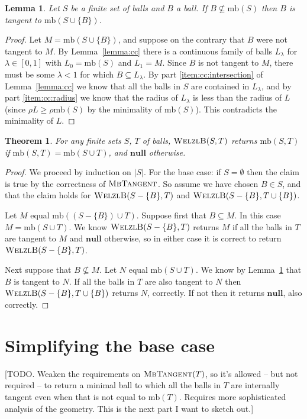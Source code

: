 \documentclass[a4paper]{article}
\newtheorem{lemma}{Lemma}[section]
\newtheorem{theorem}{Theorem}[section]
\newcommand\alg[1]{\mbox{\textsc{#1}}}
\newcommand\undef{\mathbf{null}}
\newcommand\mb{\mathrm{mb}}
\let\radius\rho
\begin{document}
\begin{lemma}\label{lemma:tangent}
  Let $S$ be a finite set of balls and $B$ a ball. If $B\not\subseteq\mb(S)$ then $B$ is tangent to $\mb(S\cup\{B\})$.
\end{lemma}
\begin{proof}
  Let $M = \mb(S\cup\{B\})$, and suppose on the contrary that $B$ were not tangent to $M$.
  By Lemma~\ref{lemma:cc} there is a continuous family of balls $L_\lambda$ for $\lambda\in[0,1]$
  with $L_0=\mb(S)$ and $L_1=M$. Since $B$ is not tangent to $M$, there must be some $\lambda<1$ for which $B\subseteq L_\lambda$. By part \ref{item:cc:intersection} of Lemma~\ref{lemma:cc} we know that all the balls in $S$ are contained in $L_\lambda$, and by part \ref{item:cc:radius} we know that the radius of $L_\lambda$ is less than the radius of $L$ (since $\radius L\geq \radius\mb(S)$ by the minimality of $\mb(S)$). This contradicts the minimality of $L$.
\end{proof}

\begin{theorem}
  For any finite sets $S$, $T$ of balls, $\alg{WelzlB}(S,T)$ returns $\mb(S,T)$ if $\mb(S,T)=\mb(S\cup T)$, and $\undef$ otherwise.
\end{theorem}
\begin{proof}
  We proceed by induction on $|S|$. For the base case: if $S=\emptyset$ then the claim is true by the correctness of $\alg{MbTangent}$. So assume we have chosen $B\in S$, and that the claim holds for $\alg{WelzlB}(S-\{B\},T)$ and $\alg{WelzlB}(S-\{B\},T\cup\{B\})$.

  Let $M$ equal $\mb((S-\{B\})\cup T)$. Suppose first that $B\subseteq M$. In this case $M=\mb(S\cup T)$. We know $\alg{WelzlB}(S-\{B\},T)$ returns $M$ if all the balls in $T$ are tangent to $M$ and $\undef$ otherwise, so in either case it is correct to return $\alg{WelzlB}(S-\{B\},T)$.

  Next suppose that $B\not\subseteq M$. Let $N$ equal $\mb(S\cup T)$. We know by Lemma~\ref{lemma:tangent} that $B$ is tangent to $N$. If all the balls in $T$ are also tangent to $N$ then $\alg{WelzlB}(S-\{B\}, T\cup\{B\})$ returns $N$, correctly. If not then it returns $\undef$, also correctly.
\end{proof}

\section{Simplifying the base case}
[TODO. Weaken the requirements on $\alg{MbTangent}(T)$, so it's allowed -- but not required -- to return a minimal ball to which all the balls in $T$ are internally tangent even when that is not equal to $\mb(T)$. Requires more sophisticated analysis of the geometry. This is the next part I want to sketch out.]
\end{document}

